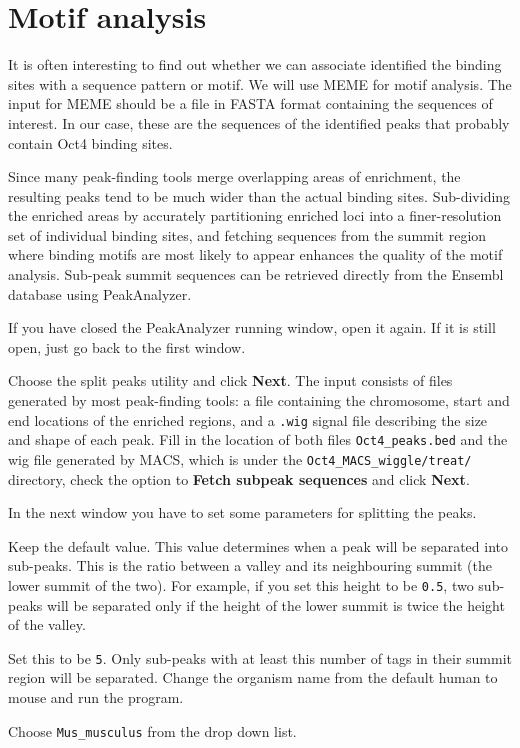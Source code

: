 \section{Motif analysis}

\begin{information}
It is often interesting to find out whether we can associate identified the
binding sites with a sequence pattern or motif. We will use MEME for motif
analysis. The input for MEME should be a file in FASTA format containing the
sequences of interest. In our case, these are the sequences of the identified
peaks that probably contain Oct4 binding sites.

Since many peak-finding tools merge overlapping areas of enrichment, the
resulting peaks tend to be much wider than the actual binding sites.
Sub-dividing the enriched areas by accurately partitioning enriched loci into a
finer-resolution set of individual binding sites, and fetching sequences from
the summit region where binding motifs are most likely to appear enhances the
quality of the motif analysis. Sub-peak summit sequences can be retrieved
directly from the Ensembl database using PeakAnalyzer.
\end{information}

\begin{steps}
If you have closed the PeakAnalyzer running window, open it again. If it is
still open, just go back to the first window.

Choose the split peaks utility and click \textbf{Next}. The input consists of
files generated by most peak-finding tools: a file containing the chromosome,
start and end locations of the enriched regions, and a \texttt{.wig} signal file
describing the size and shape of each peak. Fill in the location of both files
\texttt{Oct4\_peaks.bed} and the wig file generated by MACS, which is under the
\texttt{Oct4\_MACS\_wiggle/treat/} directory, check the option to \textbf{Fetch subpeak
sequences} and click \textbf{Next}.

In the next window you have to set some parameters for splitting the peaks.

\begin{description}[style=multiline,labelindent=0cm,align=right,leftmargin=\descriptionlabelspace,rightmargin=1.5cm,font=\ttfamily]
 \item[Separation float] Keep the default value. This value determines when a
 peak will be separated into sub-peaks. This is the ratio between a valley and
 its neighbouring summit (the lower summit of the two). For example, if you set
 this height to be \texttt{0.5}, two sub-peaks will be separated only if the
 height of the lower summit is twice the height of the valley.
 \item[Minimum height] Set this to be \texttt{5}. Only sub-peaks with at least this
 number of tags in their summit region will be separated. Change the organism
 name from the default human to mouse and run the program.
 \item[Organism] Choose \texttt{Mus\_musculus} from the drop down list.
\end{description}
\end{steps}

